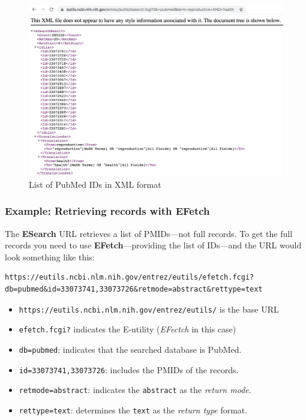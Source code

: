 \documentclass[
]{book}
\begin{document}
\begin{figure}

{\centering \includegraphics[width=0.8\linewidth]{images/api/pubmed-esearch} 

}

\caption{List of PubMed IDs in XML format}\label{fig:unnamed-chunk-147}
\end{figure}

\hypertarget{example-retrieving-records-with-efetch}{%
\subsubsection*{Example: Retrieving records with EFetch}\label{example-retrieving-records-with-efetch}}

The \textbf{ESearch} URL retrieves a list of PMIDs---not full records. To get the
full records you need to use \textbf{EFetch}---providing the list of IDs---and the
URL would look something like this:

\begin{verbatim}
https://eutils.ncbi.nlm.nih.gov/entrez/eutils/efetch.fcgi?db=pubmed&id=33073741,33073726&retmode=abstract&rettype=text
\end{verbatim}

\begin{itemize}
\item
  \texttt{https://eutils.ncbi.nlm.nih.gov/entrez/eutils/} is the base URL
\item
  \texttt{efetch.fcgi?} indicates the E-utility (\emph{EFectch} in this case)
\item
  \texttt{db=pubmed}: indicates that the searched database is PubMed.
\item
  \texttt{id=33073741,33073726}: includes the PMIDs of the records.
\item
  \texttt{retmode=abstract}: indicates the \texttt{abstract} as the \emph{return mode}.
\item
  \texttt{rettype=text}: determines the \texttt{text} as the \emph{return type} format.
\end{itemize}
\end{document}
